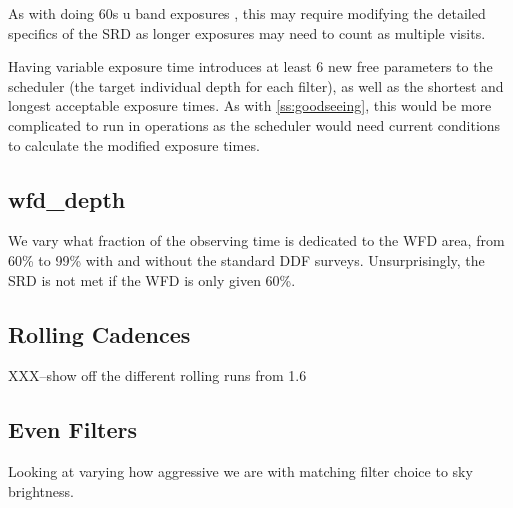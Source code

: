 As with doing 60s u band exposures , this may require modifying the detailed specifics of the SRD as longer exposures may need to count as multiple visits.

Having variable exposure time introduces at least 6 new free parameters to the scheduler (the target individual depth for each filter), as well as the shortest and longest acceptable exposure times.  As with \ref{ss:goodseeing}, this would be more complicated to run in operations as the scheduler would need current conditions to calculate the modified exposure times.

\subsection{wfd\_depth}

We vary what fraction of the observing time is dedicated to the WFD area, from 60\% to 99\% with and without the standard DDF surveys. Unsurprisingly, the SRD is not met if the WFD is only given 60\%.



\subsection{Rolling Cadences}

XXX--show off the different rolling runs from 1.6

\subsection{Even Filters}

Looking at varying how aggressive we are with matching filter choice to sky brightness.  







